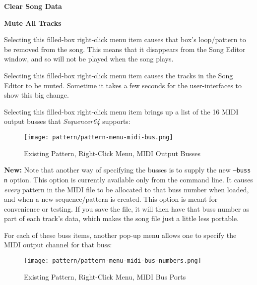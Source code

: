    \begin{enumber}
      \item \textbf{Clear Song Data}
      \item \textbf{Mute All Tracks}
   \end{enumber}

   \setcounter{ItemCounter}{0}      %

   Selecting this filled-box right-click menu item causes that box's
   loop/pattern to be removed from the song.  This means
   that it disappears from the Song Editor window, and so will not
   be played when the song plays.

   Selecting this filled-box right-click menu item causes
   the tracks in the Song Editor to be muted.  Sometime it takes a few seconds
   for the user-interfaces to show this big change.

   Selecting this filled-box right-click menu item brings up a list
   of the 16 MIDI output busses that \textsl{Sequencer64} supports:

\begin{figure}[H]
   \centering 
   \texttt{[image: pattern/pattern-menu-midi-bus.png]}
   \caption{Existing Pattern, Right-Click Menu, MIDI Output Busses}
   \label{fig:pattern_window_right_click_midi_bus}
\end{figure}

   \textbf{New:}
   Note that another way of specifying the busses is to supply the
   new \texttt{--buss n} option.  This option is currently available
   only from the command line.  It causes \textsl{every} pattern in the MIDI
   file to be allocated to that buss number when loaded, and when a new
   sequence/pattern is created.  This option is
   meant for convenience or testing.  If you save the file, it will then
   have that buss number as part of each track's data, which makes the song
   file just a little less portable.

   For each of these buss items, another pop-up menu allows one
   to specify the MIDI output channel for that buss:

\begin{figure}[H]
   \centering 
   \texttt{[image: pattern/pattern-menu-midi-bus-numbers.png]}
   \caption{Existing Pattern, Right-Click Menu, MIDI Bus Ports}
   \label{fig:pattern_window_right_click_midi_bus_numbers}
\end{figure}

